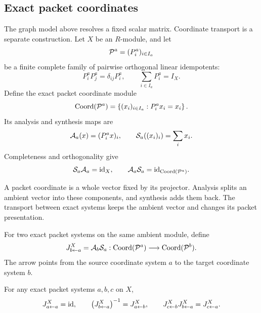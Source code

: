 \subsection{Exact packet coordinates}

The graph model above resolves a fixed scalar matrix.  Coordinate transport
is a separate construction.  Let $X$ be an $R$-module, and let
\[
\mathcal P^a=(P^a_i)_{i\in I_a}
\]
be a finite complete family of pairwise orthogonal linear idempotents:
\[
P^a_iP^a_j=\delta_{ij}P^a_i,
\qquad
\sum_{i\in I_a}P^a_i=I_X.
\]
Define the exact packet coordinate module
\[
\operatorname{Coord}(\mathcal P^a)
=
\left\{(x_i)_{i\in I_a}:P^a_ix_i=x_i\right\}.
\]
Its analysis and synthesis maps are
\[
\mathcal A_a(x)=(P^a_ix)_i,
\qquad
\mathcal S_a((x_i)_i)=\sum_ix_i.
\]
Completeness and orthogonality give
\[
\mathcal S_a\mathcal A_a=\mathrm{id}_X,
\qquad
\mathcal A_a\mathcal S_a=\mathrm{id}_{\operatorname{Coord}(\mathcal P^a)}.
\]

\begin{keyidea}[title={What a packet coordinate contains}]
A packet coordinate is a whole vector fixed by its projector. Analysis splits
an ambient vector into these components, and synthesis adds them back. The
transport between exact systems keeps the ambient vector and changes its
packet presentation.
\end{keyidea}

\begin{definition}
\label{def:canonical-J}
For two exact packet systems on the same ambient module, define
\[
  J^X_{b\leftarrow a}
  =
  \mathcal A_b\mathcal S_a:
  \operatorname{Coord}(\mathcal P^a)\longrightarrow\operatorname{Coord}(\mathcal P^b).
\]
The arrow points from the source coordinate system $a$ to the target
coordinate system $b$.
\end{definition}

\begin{theorem}
\label{thm:J-cocycle}
For any exact packet systems $a,b,c$ on $X$,
\[
J^X_{a\leftarrow a}=\mathrm{id},
\qquad
\left(J^X_{b\leftarrow a}\right)^{-1}=J^X_{a\leftarrow b},
\qquad
J^X_{c\leftarrow b}J^X_{b\leftarrow a}=J^X_{c\leftarrow a}.
\]
\end{theorem}

